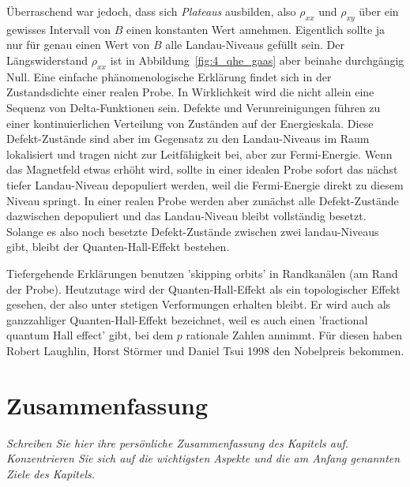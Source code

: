 Überraschend war jedoch, dass sich \emph{Plateaus} ausbilden, also  $\rho_{xx}$  und $\rho_{xy}$ über ein gewisses Intervall von $B$ einen konstanten Wert annehmen. Eigentlich sollte ja nur für genau einen Wert von  $B$ alle Landau-Niveaus gefüllt sein. Der Längswiderstand $\rho_{xx}$ ist in Abbildung~\ref{fig:4_qhe_gaas} aber beinahe durchgängig Null.  Eine einfache phänomenologische Erklärung findet sich in der Zustandsdichte einer realen Probe. In Wirklichkeit wird die nicht allein eine Sequenz von Delta-Funktionen sein. Defekte und Verunreinigungen führen zu einer kontinuierlichen Verteilung von Zuständen auf der Energieskala. Diese Defekt-Zustände sind aber im Gegensatz zu den Landau-Niveaus im Raum lokalisiert und tragen nicht zur Leitfähigkeit bei, aber zur Fermi-Energie. Wenn das Magnetfeld  etwas erhöht wird, sollte in einer idealen Probe sofort das nächst tiefer  Landau-Niveau depopuliert werden, weil die Fermi-Energie direkt zu diesem Niveau springt. In einer realen Probe werden aber zunächst alle Defekt-Zustände dazwischen depopuliert und das Landau-Niveau bleibt vollständig besetzt. Solange es also noch besetzte Defekt-Zustände zwischen zwei landau-Niveaus gibt, bleibt der Quanten-Hall-Effekt bestehen.

Tiefergehende Erklärungen benutzen 'skipping orbits' in Randkanälen (am Rand der Probe). Heutzutage wird der Quanten-Hall-Effekt als ein topologischer Effekt gesehen, der also unter stetigen Verformungen erhalten  bleibt. Er wird auch als ganzzahliger Quanten-Hall-Effekt bezeichnet, weil es auch einen 'fractional quantum Hall effect' gibt, bei dem $p$ rationale Zahlen annimmt. Für diesen haben Robert Laughlin, Horst Störmer und Daniel Tsui 1998 den Nobelpreis bekommen.





\newpage

\section{Zusammenfassung}

\textit{Schreiben Sie hier ihre persönliche Zusammenfassung des Kapitels auf. Konzentrieren Sie sich auf die wichtigsten Aspekte und die am Anfang genannten Ziele des Kapitels.}

\vspace*{10cm}
\printbibliography[segment=\therefsegment,heading=subbibliography]
